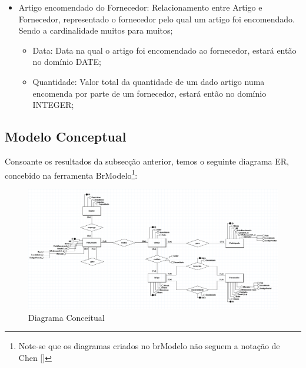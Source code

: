 \documentclass[a4paper,12pt]{scrreprt}
\begin{document}
\begin{itemize}
\begin{itemize}
                     \end{itemize}
                 \item{Artigo encomendado do Fornecedor:} Relacionamento entre Artigo e Fornecedor, representado o fornecedor pelo qual um artigo foi encomendado. Sendo a cardinalidade muitos para muitos;
                     \begin{itemize}
                     \item{Data:} Data na qual o artigo foi encomendado ao fornecedor, estará então no domínio DATE;
                       
                     \item{Quantidade:} Valor total da quantidade de um dado artigo numa encomenda por parte de um fornecedor, estará então no domínio INTEGER;
                       
                     \end{itemize}
             \end{itemize}
\newpage
        \subsection{Modelo Conceptual}
        Consoante os resultados da subsecção anterior, temos o seguinte diagrama ER,
        concebido na ferramenta BrModelo\footnote{Note-se que os diagramas criados no brModelo
        não seguem a notação de Chen [\cite{chen}]}:
        \begin{figure}[H]
            \centering
            \includegraphics[width=4.75in]{images/Conceptual_Com_Atributos.png}
            \caption{Diagrama Conceitual}
        \end{figure}
        
        

    
\end{document}
